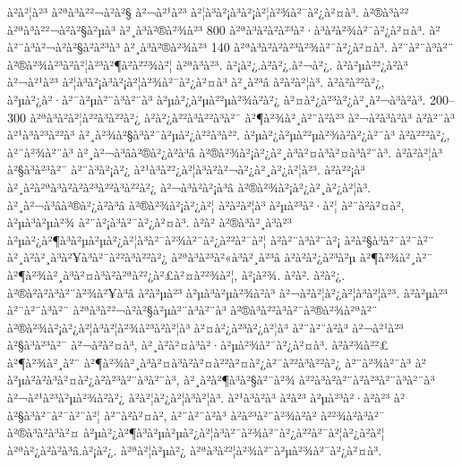 à²à²¦à²³ à²ªà³à²²¬à²à²§ à²¬à²¹à²³ à²¦à³à²¡à³à²¡à²¦à²¾à²¯à²¿à²¤à³. à²®à³à²² à²ªà³à²²¬à²à²§à²µà³ à²¸à³à²®à²¾à²³ 800 à²ªà³à²à²à²³à²·à³à²à²¾à²¯à²¿à²¤à³. à²à²¨à³à²¬à²à²§à²à²³à³ à²¸à³à²®à²¾à²³ 140 à²ªà³à²à²à²³à²¾à²¯à²¿à²¤à³. à²¨à²¨à³à²¨ à²®à²¾à²³à²à²¦à²³à²¶à²à²²¾à²¦ à²ªà³à²³. à²¡à²¿.à²à²¿.à²¬à²¿. à²à²µà²²¿à²à³ à²¬à²¹à²³ à²¦à³à²¡à³à²¡à²¦à²¾à²¯à²¿à²¤à³ à²¸à²³â à²à²à²¦à³. à²à²à²²à²¿, à²µà²¿à²·à²¯à²µà²¨à³à²¨à³ à²µà²¿à²µà²²µà²¾à²à²¿ à²¤à²¿à²³à²¿à²¸à²¬à³à²à³. 200–300 à²ªà³à²à²¦à²²à³à²²à²¿ à²à²¿à²²à³à²²à³à²¯ à²¶à²¾à²¸à²¨à²à²³ à²¬à²à³à²à³ à²à²¨à³ à²¹à³à²³à²²à³ à²¸à²¾à²§à³à²¯à²µà²¿à²²à³à²². à²µà²¿à²µà²²µà²¾à²à²¿à²¯à³ à²à²²²à²¿, à²¨à²¾à²¨à³ à²¸à²¬à³âà²®à²¿à²à³â à²®à²¾à²¡à²¿à²¸à³à²¤à³à²¤à³à²¨à³. à²à²à²¦à³ à²§à³à²³à²¯ à²¨à³à²¡à²¿ à²¹à³à²²¿à²¦à³à²à²¬à²¿à²¸à²¿à²¦à²³. à²à²²¡à³ à²¸à²à²ªà³à²à²à²³à²²à³à²²à²¿ à²¬à³à²à²¡à³â à²®à²¾à²¡à²¿à²¸à²¿à²¦à³. à²¸à²¬à³âà²®à²¿à²à³â à²®à²¾à²¡à²¿à²¦ à²à²à²¦à³ à²µà²³à²·à²¦ à²¨à²à²¤à²\circ, à²µà³à²µà²¾ à²¨à²¡à³à²¯à²¿à²¤à³. à²à² à²®à³à²¸à³à²³ à²µà²¿à²¶à³à²µà²µà²¿à²¦à³à²¯à²¾à²¨à²¿à²²à²¯à²¦ à²à²¨à³à²¨à²¡ à²à²§à³à²¯à²¯à²¨ à²¸à²à²¸à³à²¥à³à²¯à²²à³à²²à²¿ à²ªà³à²³à²«à³à²¸à²³â à²à²à²¿à²³à²µ à²¶à²¾à²¸à²¨ à²¶à²¾à²¸à³à²¤à³à²\circ à²ªà²²¿à²£à²¤à²²¾à²¦, à²¡à²¾. à²à². à²à²¿. à²®à²à²à³à²¨à²¾à²¥à³â à²à²µà²³ à²µà³à²µà²¾à²à³ à²¬à²à²¦à²¿à²¦à³à²¦à²³. à²à²µà²³ à²¨à²¨à³à²¨ à²ªà³à²²¬à²à²§à²µà²¨à³à²¨à³ à²®à³à²²à³à²¯à²®à²¾à²ªà²¨ à²®à²¾à²¡à²¿à²¦à³à²¦à²¾à²³à²à²¦à³ à²¤à²¿à²³à²¿à²¦à³ à²¨à²¨à²à³ à²¬à²¹à²³ à²§à³à²³à²¯ à²¬à²à²¤à³, à²¸à²à²¤à³à²·à²µà²¾à²¯à²¿à²¤à³. à²à²¾à²²£ à²¶à²¾à²¸à²¨ à²¶à²¾à²¸à³à²¤à³à²\circ à²¤à²²à²¤à²¿à²¯à²²à³à²²à²¿ à²¨à²¾à²¨à³ à²à²µà²\circ à²à³à²¤à²¿à²à²³à²¨à³à²¨à³, à²¸à²à²¶à³à²§à²¨à²¾ à²²à³à²à²¨à²à²³à²¨à³à²¨à³ à²¬à²¹à²³à²µà²¾à²à²¿ à²à²¦à²¿à²¦à³à²¦à³. à²¹à³à²à³ à²à²³ à²µà²³à²·à²à²³ à²à²§à³à²¯à²¯à²¨à²¦ à²¨à²à²¤à²\circ, à²¨à²¨à²à³ à²à²³à²¨à²¾à²à² à²²¾à²à³à²¯ à²®à³à²à³à²¤ à²µà²¿à²¶à³à²µà²µà²¿à²¦à³à²¯à²¾à²¨à²¿à²²à²¯à²¦à²¿à²à²¦ à²ªà²¿à²à²à³â.à²¡à²¿. à²ªà²¦à²µà²¿ à²ªà³à²²¦à²¾à²¨à²µà²¾à²¯à²¿à²¤à³. 


